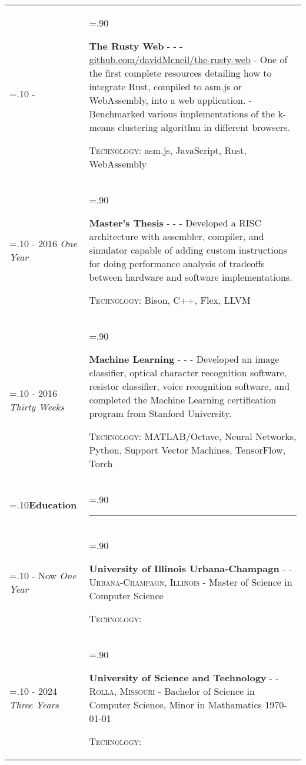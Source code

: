 \documentclass[10pt]{article}
\newcommand{\timeFrame}[3] {
  \if\relax\detokenize{#2}\relax
    #1
  \else
    #1 - #2
  \fi
  \newline
  \scriptsize \textit{#3}
}
\newcommand{\entry}[6] {
  \textbf{#1}
  \if\relax\detokenize{#2}\relax
  \else
       - \textsc{#2}
  \fi
  \if\relax\detokenize{#3}\relax
  \else
      - \textsc{#3}
  \fi
  \if\relax\detokenize{#4}\relax
  \else
      - \href{https://#4}{#4}
  \fi
  \newline #5
  \if\relax\detokenize{#6}\relax
  \else
      \newline \textsc{Technology:} #6
  \fi
  \\
}
\newcommand{\horizontalLine}[0] {
    \noindent\rule{.90\linewidth}{0.4pt}
}
\begin{document}
\begin{tabularx}{\linewidth}{>{\hsize=.10\hsize}X>{\hsize=.90\hsize}X}
\timeFrame{2017}{}{} &
\entry{The Rusty Web}
  {}
  {}
  {github.com/davidMcneil/the-rusty-web}
  {
  - One of the first complete resources detailing how to integrate Rust, compiled to asm.js or WebAssembly, into a web application. \newline
  - Benchmarked various implementations of the k-means clustering algorithm in different browsers.
  }
  {asm.js, JavaScript, Rust, WebAssembly}

\timeFrame{2015}{2016}{One Year} &
\entry{Master's Thesis}
  {}
  {}
  {}
  {
  Developed a RISC architecture with assembler, compiler, and simulator capable of adding custom instructions for doing performance analysis of tradeoffs between hardware and software implementations.
  }
  {Bison, C++, Flex, LLVM}

\timeFrame{2015}{2016}{Thirty Weeks} &
\entry{Machine Learning}
  {}
  {}
  {}
  {
  Developed an image classifier, optical character recognition software, resistor classifier, voice recognition software, and completed the Machine Learning certification program from Stanford University.
  }
  {MATLAB/Octave, Neural Networks, Python, Support Vector Machines, TensorFlow, Torch}

\textbf{Education} & \horizontalLine \\

\timeFrame{2024}{Now}{One Year} &
\entry{University of Illinois Urbana-Champagn}
  {}
  {Urbana-Champagn, Illinois}
  {}
  {
  Master of Science in Computer Science %
  }
  {}

\timeFrame{2021}{2024}{Three Years} &
\entry{University of Science and Technology}
  {}
  {Rolla, Missouri}
  {}
  {
  Bachelor of Science in Computer Science, Minor in Mathamatics \hfill \today
  }
  {}

\end{tabularx}
\end{document}
